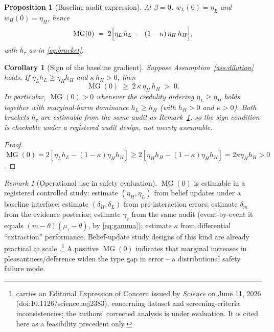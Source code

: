 \documentclass[11pt]{article}
\newtheorem{proposition}[theorem]{Proposition}
\newtheorem{corollary}[theorem]{Corollary}
\theoremstyle{definition}
\theoremstyle{remark}
\newtheorem{remark}[theorem]{Remark}
\numberwithin{equation}{section}
\DeclareMathOperator{\MG}{MG}
\begin{document}
\begin{proposition}[Baseline audit expression]\label{prop:baseline}
At $\beta = 0$, $w_L(0) = \eta_L$ and $w_H(0) = \eta_H$, hence
\begin{equation}\label{eq:mgzero}
\MG(0) \;=\; 2\Bigl[\eta_L\, h_L \;-\; (1-\kappa)\,\eta_H\, h_H\Bigr],
\end{equation}
with $h_\tau$ as in \eqref{eq:bracket}.
\end{proposition}

\begin{corollary}[Sign of the baseline gradient]\label{cor:mgsign}
Suppose Assumption~\ref{ass:dilution} holds. If $\eta_L h_L \ge \eta_H h_H$ and $\kappa\, h_H > 0$, then
\[
\MG(0) \;\ge\; 2\,\kappa\,\eta_H\, h_H \;>\; 0.
\]
In particular, $\MG(0) > 0$ whenever the credulity ordering $\eta_L \ge \eta_H$ holds together with marginal-harm dominance $h_L \ge h_H$ (with $h_H > 0$ and $\kappa > 0$). Both brackets $h_\tau$ are estimable from the same audit as Remark~\ref{rem:operational}, so the sign condition is checkable under a registered audit design, not merely assumable.
\end{corollary}

\begin{proof}
$\MG(0) = 2[\eta_L h_L - (1-\kappa)\eta_H h_H] \ge 2[\eta_H h_H - (1-\kappa)\eta_H h_H] = 2\kappa \eta_H h_H > 0$.
\end{proof}

\begin{remark}[Operational use in safety evaluation]\label{rem:operational}
$\MG(0)$ is estimable in a registered controlled study: estimate $(\eta_H, \eta_L)$ from belief updates under a baseline interface; estimate $(\delta_H, \delta_L)$ from pre-interaction errors; estimate $\delta_m$ from the evidence posterior; estimate $\gamma_\tau$ from the same audit (event-by-event it equals $(m-\theta)(\mu_\tau-\theta)$, by \eqref{eq:gamma}); estimate $\kappa$ from differential ``extraction'' performance. Belief-update study designs of this kind are already practical at scale \citep{costello2024durably, salvi2025conversational}.\footnote{\citet{costello2024durably} carries an Editorial Expression of Concern issued by \emph{Science} on June 11, 2026 (doi:10.1126/science.aej2383), concerning dataset and screening-criteria inconsistencies; the authors' corrected analysis is under evaluation. It is cited here as a feasibility precedent only.} A positive $\MG(0)$ indicates that marginal increases in pleasantness/deference widen the type gap in error -- a distributional safety failure mode.
\end{remark}
\end{document}
